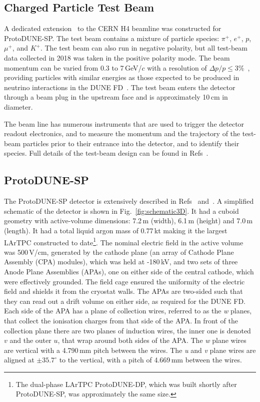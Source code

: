 \documentclass[epjc3]{svjour3}
\begin{document}
\subsection{Charged Particle Test Beam}

A dedicated extension~\cite{PhysRevAccelBeams.20.111001,PhysRevAccelBeams.22.061003} to the CERN H4 beamline was constructed for ProtoDUNE-SP. The test beam contains a mixture of particle species: $\pi^{+}$, $e^{+}$, $p$, $\mu^{+}$, and $K^{+}$. The test beam can also run in negative polarity, but all test-beam data collected in 2018 was taken in the positive polarity mode. The beam momentum can be varied from 0.3 to 7\,GeV/$c$ with a resolution of $\Delta p/p \leq 3\%$~\cite{pdtdr}, providing particles with similar energies as those expected to be produced in neutrino interactions in the DUNE FD~\cite{dune_sense}. The test beam enters the detector through a beam plug in the upstream face and is approximately 10\,cm in diameter.

The beam line has numerous instruments that are used to trigger the detector readout electronics, and to measure the momentum and the trajectory of the test-beam particles prior to their entrance into the
detector, and to identify their species. Full details of the test-beam design can be found in Refs~\cite{proto_performance,PhysRevAccelBeams.20.111001,PhysRevAccelBeams.22.061003}.

\subsection{ProtoDUNE-SP}
\label{sec:protodunesp}
The ProtoDUNE-SP detector is extensively described in Refs~\cite{protoduneDetector} and~\cite{proto_performance}. A simplified schematic of the detector is shown in Fig.~\ref{fig:schematic3D}. It had a cuboid geometry with active-volume dimensions: 7.2\,m (width), 6.1\,m (height) and 7.0\,m (length). It had a total liquid argon mass of 0.77\,kt making it the largest LArTPC constructed to date\footnote{The dual-phase LArTPC ProtoDUNE-DP, which was built shortly after ProtoDUNE-SP, was approximately the same size.}. The nominal electric field in the active volume was 500\,V/cm, generated by the cathode plane (an array of Cathode Plane Assembly (CPA) modules), which was held at -180\,kV, and two sets of three Anode Plane Assemblies (APAs), one on either side of the central cathode, which were effectively grounded. The field cage ensured the uniformity of the electric field and shields it from the cryostat walls. The APAs are two-sided such that they can read out a drift volume on either side, as required for the DUNE FD. Each side of the APA has a plane of collection wires, referred to as the \textit{w} planes, that collect the ionisation charges from that side of the APA. In front of the collection plane there are two planes of induction wires, the inner one is denoted $v$ and the outer $u$, that wrap around both sides of the APA. The \textit{w} plane wires are vertical with a 4.790\,mm pitch between the wires. The \textit{u} and \textit{v} plane wires are aligned at $\pm35.7^\circ$ to the vertical, with a pitch of 4.669\,mm between the wires.
\end{document}
